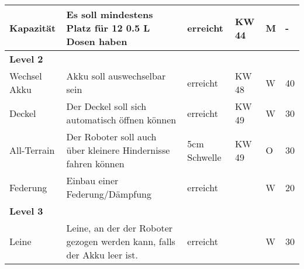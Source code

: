 \begin{table}[H]
{\begin{tabular}{|llllll|}
    \multicolumn{1}{|l|}{Kapazität}       & \multicolumn{1}{l|}{Es soll mindestens   Platz für 12 0.5 L Dosen haben}                         & \multicolumn{1}{l|}{erreicht}         & \multicolumn{1}{l|}{KW 44}              & \multicolumn{1}{l|}{M}                & -                  \\ \hline
    \multicolumn{6}{|l|}{\textbf{Level 2}}                                                                                                                                                                                                                                                  \\ \hline
    \multicolumn{1}{|l|}{Wechsel Akku}    & \multicolumn{1}{l|}{Akku soll   auswechselbar sein}                                              & \multicolumn{1}{l|}{erreicht}         & \multicolumn{1}{l|}{KW 48}              & \multicolumn{1}{l|}{W}                & 40                 \\ \hline
    \multicolumn{1}{|l|}{Deckel}          & \multicolumn{1}{l|}{Der Deckel soll sich   automatisch öffnen können}                            & \multicolumn{1}{l|}{erreicht}         & \multicolumn{1}{l|}{KW 49}              & \multicolumn{1}{l|}{W}                & 30                 \\ \hline
    \multicolumn{1}{|l|}{All-Terrain}     & \multicolumn{1}{l|}{Der Roboter soll   auch über kleinere Hindernisse fahren können}             & \multicolumn{1}{l|}{5cm Schwelle}     & \multicolumn{1}{l|}{KW 49}              & \multicolumn{1}{l|}{O}                & 30                 \\ \hline
    \multicolumn{1}{|l|}{Federung}        & \multicolumn{1}{l|}{Einbau einer   Federung/Dämpfung}                                            & \multicolumn{1}{l|}{erreicht}         & \multicolumn{1}{l|}{}                   & \multicolumn{1}{l|}{W}                & 20                 \\ \hline
    \multicolumn{6}{|l|}{\textbf{Level 3}}                                                                                                                                                                                                                                                  \\ \hline
    \multicolumn{1}{|l|}{Leine}           & \multicolumn{1}{l|}{Leine, an der der   Roboter gezogen werden kann, falls der Akku leer ist.}   & \multicolumn{1}{l|}{erreicht}         & \multicolumn{1}{l|}{}                   & \multicolumn{1}{l|}{W}                & 30                 \\ \hline

\end{tabular}}
\end{table}
